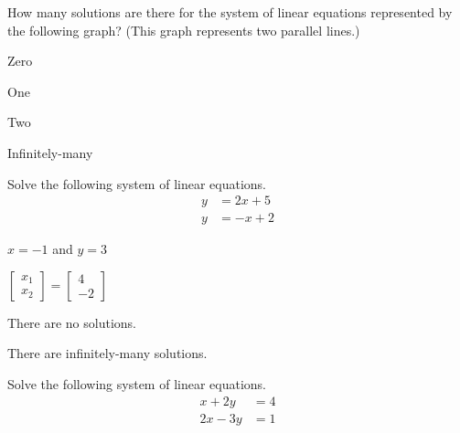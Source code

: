 \begin{readinessAssuranceTest}
\item How many solutions are there for the system of linear equations
      represented by the following graph? (This graph represents two
      parallel lines.)
    \begin{center}
      \systemWithNoSolutions
    \end{center}

\begin{multicols}{4}
\begin{readinessAssuranceTestChoices}
\item Zero
\item One
\item Two
\item Infinitely-many
\end{readinessAssuranceTestChoices}
\end{multicols}

\item Solve the following system of linear equations.
      \begin{align*}
      y   &=   2x+5 \\
      y  &=  -x+2
      \end{align*}

\begin{multicols}{4}
\begin{readinessAssuranceTestChoices}
\item
\(x=-1\) and \(y=3\) %
\item
\(
  \begin{bmatrix}
    x_1 \\
    x_2
  \end{bmatrix}=
  \begin{bmatrix}
    4 \\
    -2
  \end{bmatrix}
\)
\item There are no solutions.
\item There are infinitely-many solutions.
\end{readinessAssuranceTestChoices}
\end{multicols}

\item Solve the following system of linear equations.
      \begin{align*}
      x+2y   &=   4 \\
      2x-3y  &=  1
      \end{align*}


\end{readinessAssuranceTest}
